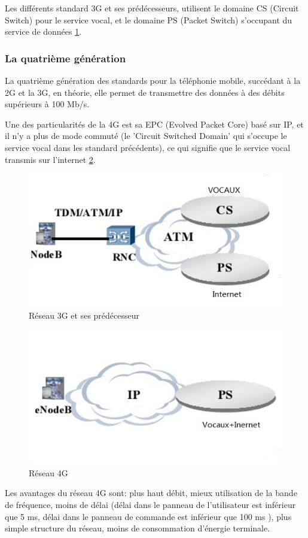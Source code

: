 Les différents standard  3G et ses prédécesseurs, utilisent le domaine CS (Circuit Switch)  pour le service vocal, et le domaine PS (Packet Switch) s'occupant du service de données \ref{fig:3G2}.
\subsubsection{La quatrième génération}
La quatrième génération des standards pour la téléphonie mobile, succédant à la 2G et la 3G, en théorie, elle permet de transmettre des données à des débits supérieurs à 100 Mb/s. 

Une des particularités de la 4G est sa EPC (Evolved Packet Core) basé sur IP, et il n'y a plus de mode commuté (le 'Circuit Switched Domain' qui s'occupe le service vocal dans les standard précédents), ce qui signifie que le service vocal transmis sur l'internet \ref{fig:4g}. 
\begin{figure}[H]
\centering
\includegraphics[width=0.7\linewidth]{images/3G2}
\caption{Réseau 3G et ses prédécesseur}
\label{fig:3G2}
\end{figure}
\begin{figure}[H]
\centering
\includegraphics[width=0.7\linewidth]{images/4g}
\caption{Réseau 4G}
\label{fig:4g}
\end{figure}




Les avantages du réseau 4G sont:  plus haut débit, mieux utilisation de la bande de fréquence, moins de délai (délai dans le panneau de l'utilisateur est inférieur que 5 ms, délai dans le panneau de commande est inférieur que 100 ms ), plus simple structure du réseau, moins de consommation d'énergie terminale.

